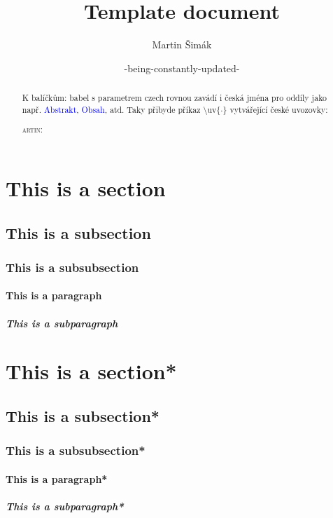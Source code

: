 \documentclass[11pt,a4paper]{report}
\title{Template document}
\author{Martin Šimák}
\date{-being-constantly-updated-}
\theoremstyle{remark}
\theoremstyle{definition}
\begin{document}
	
	
	\maketitle
	
	\begin{abstract}
		K balíčkům: babel s parametrem czech rovnou zavádí i česká jména pro oddíly jako např. \textcolor{blue}{Abstrakt}, \textcolor{blue}{Obsah}, atd. Taky přibyde příkaz \textbackslash uv\{$\cdot$\} vytvářející české uvozovky: 
		
		\lettrine{
			\gothfamily\fontsize{50}{60}\scalebox{2}{M}{}
		}{artin:}
		\lipsum[1]
	\end{abstract}
	
	\newpage

	\tableofcontents %
	\newpage
	
	
	\section{This is a section}
	\subsection{This is a subsection}
	\subsubsection{This is a subsubsection}
	\paragraph{This is a paragraph}
	\subparagraph{This is a subparagraph}
	
	\section*{This is a section*}
	\subsection*{This is a subsection*}
	\subsubsection*{This is a subsubsection*}
	\paragraph*{This is a paragraph*}
	\subparagraph*{This is a subparagraph*}
	
\end{document}
